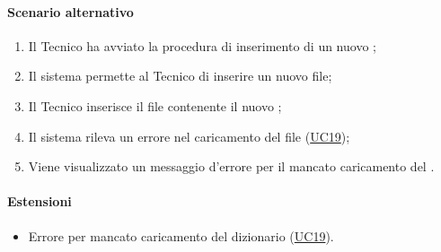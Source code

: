 \paragraph*{Scenario alternativo}
\begin{enumerate}
  \item Il Tecnico ha avviato la procedura di inserimento di un nuovo ;
  \item Il sistema permette al Tecnico di inserire un nuovo file;
  \item Il Tecnico inserisce il file contenente il nuovo ;
  \item Il sistema rileva un errore nel caricamento del file (\hyperref[UC19]{UC19});
  \item Viene visualizzato un messaggio d'errore per il mancato caricamento del .
\end{enumerate}

\paragraph*{Estensioni}
\begin{itemize}
  \item Errore per mancato caricamento del dizionario (\hyperref[UC19]{UC19}).
\end{itemize}
